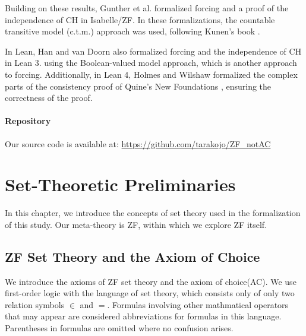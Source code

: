 \documentclass{report}
\begin{document}
Building on these results, Gunther et al. formalized forcing and a proof of the independence of CH \cite{gunther_forcing,gunther_independence} in Isabelle/ZF.
In these formalizations, the countable transitive model (c.t.m.) approach was used, following Kunen's book \cite{kunen2011}.

In Lean, Han and van Doorn also formalized forcing and the independence of CH \cite{flypitch} in Lean 3.
using the Boolean-valued model approach, which is another approach to forcing.
Additionally, in Lean 4, Holmes and Wilshaw formalized the complex parts of the consistency proof of Quine's New Foundations \cite{NF_consistency}, ensuring the correctness of the proof.



\begin{comment}
  section2-...で説明するように、c.t.m.の存在はconzfからは導けないが、正当性が言えるのです
\end{comment}

\subsubsection{Repository}
Our source code is available at: \url{https://github.com/tarakojo/ZF_notAC}


 

\chapter{Set-Theoretic Preliminaries}
In this chapter, we introduce the concepts of set theory used in the formalization of this study.
Our meta-theory is ZF, within which we explore ZF itself.

\section{ZF Set Theory and the Axiom of Choice}
We introduce the axioms of ZF set theory and the axiom of choice(AC).
We use first-order logic with the language of set theory, which consists only of only two relation symbols $\in$ and $=$. 
Formulas involving other mathmatical operators that may appear are considered abbreviations for formulas in this language.
Parentheses in formulas are omitted where no confusion arises.
\end{document}
